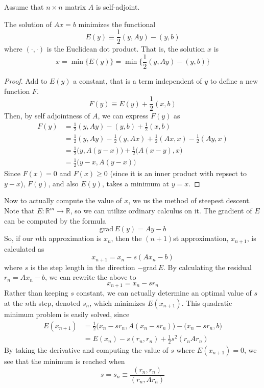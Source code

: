   Assume that $n \times n$ matrix $A$ is self-adjoint.
  \begin{theorem}
  The solution of $Ax = b$ minimizes the functional 
  \[E (y) \equiv \frac{1}{2} (y, A y) - (y, b)\]
  where $(\cdot, \cdot)$ is the Euclidean dot product. That is, the solution $x$ is
  \[x = \min \big\{ E(y) \big\} = \min \Big\{ \frac{1}{2} (y, Ay) - (y, b) \Big\}\]
  \end{theorem}
  \begin{proof}
  Add to $E(y)$ a constant, that is a term independent of $y$ to define a new function $F$. 
  \[F(y) \equiv E(y) + \frac{1}{2} (x, b)\]
  Then, by self adjointness of $A$, we can express $F(y)$ as 
  \begin{align*}
      F(y) & = \frac{1}{2} (y, Ay) - (y, b) + \frac{1}{2} (x, b) \\
      & = \frac{1}{2} (y, Ay) - \frac{1}{2} (y, Ax) + \frac{1}{2} (Ax, x) - \frac{1}{2} (Ay, x) \\
      & = \frac{1}{2} \big( y, A(y-x)\big) + \frac{1}{2} \big( A(x-y), x\big) \\
      & = \frac{1}{2} \big( y - x, A(y - x)\big) 
  \end{align*}
  Since $F(x) = 0$ and $F(x) \geq 0$ (since it is an inner product with repsect to $y-x$), $F(y)$, and also $E(y)$, takes a minimum at $y =x$. 
  \end{proof}

  Now to actually compute the value of $x$, we us the method of steepest descent. Note that $E: \mathbb{R}^m \longrightarrow \mathbb{R}$, so we can utilize ordinary calculus on it. The gradient of $E$ can be computed by the formula 
  \[\text{grad}\,E(y) = A y - b\]
  So, if our $n$th approximation is $x_n$, then the $(n+1)$st approximation, $x_{n+1}$, is calculated as
  \[x_{n+1} = x_n - s (Ax_n - b)\]
  where $s$ is the step length in the direction $-$grad$\,E$. By calculating the residual $r_n = A x_n - b$, we can rewrite the above to
  \[x_{n+1} = x_n - s r_n\]
  Rather than keeping $s$ constant, we can actually determine an optimal value of $s$ at the $n$th step, denoted $s_n$, which minimizes $E(x_{n+1})$. This quadratic minimum problem is easily solved, since
  \begin{align*}
      E(x_{n+1}) & = \frac{1}{2} \big(x_n - s r_n, A(x_n - s r_n) \big) - \big( x_n - s r_n, b\big) \\
      & = E(x_n) - s (r_n, r_n) + \frac{1}{2} s^2 (r_n A r_n)
  \end{align*}
  By taking the derivative and computing the value of $s$ where $E (x_{n+1}) = 0$, we see that the minimum is reached when 
  \[s = s_n \equiv \frac{(r_n, r_n)}{(r_n, A r_n)}\]

